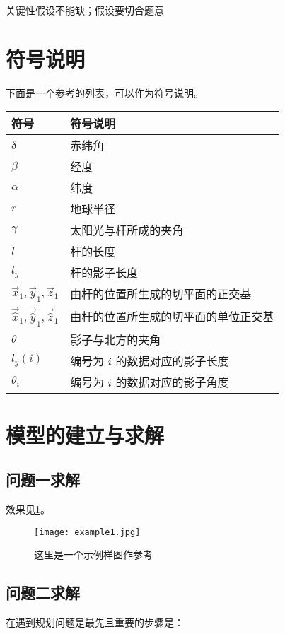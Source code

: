 \documentclass{suesmmthesis}
\begin{document}
    关键性假设不能缺；假设要切合题意
    \section{符号说明}
    下面是一个参考的列表，可以作为符号说明。
    \begin{center}
		\begin{tabular}{p{}<{\centering}p{}<{\centering}}
			\toprule[1.5pt]
            符号 & 符号说明\\
            \midrule[0.75pt]
			$\delta$ & 赤纬角\\
			$\beta$ & 经度\\
			$\alpha$ & 纬度\\
			$r$ & 地球半径\\
			$\gamma$ & 太阳光与杆所成的夹角\\
			$l$ & 杆的长度\\
			$l_{y}$ & 杆的影子长度\\
			$\vec{x}_{1},\vec{y}_{1},\vec{z}_{1}$ & 由杆的位置所生成的切平面的正交基\\
			$\vec{\hat{x}}_{1},\vec{\hat{y}}_{1},\vec{\hat{z}}_{1}$ & 由杆的位置所生成的切平面的单位正交基\\
			$\theta$ & 影子与北方的夹角\\
			$l_{y}(i)$ & 编号为 $i$ 的数据对应的影子长度\\
			$\theta_{i}$ & 编号为 $i$ 的数据对应的影子角度\\
			\bottomrule[1.5pt]
		\end{tabular}
	\end{center}

    \section{模型的建立与求解}
    \subsection{问题一求解}
    效果见\cref{fig:exmaple1}。
	\begin{figure}[htbp]
		\centering
		\texttt{[image: example1.jpg]}
		\caption{这里是一个示例样图作参考}
        \label{fig:exmaple1}
	\end{figure}
    \subsection{问题二求解}
    在遇到规划问题是最先且重要的步骤是：
\end{document}
